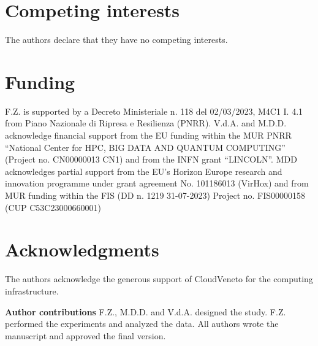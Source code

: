\documentclass[10pt, aps, rmp,  twocolumn, superscriptaddress, floatfix, showkeys]{revtex4-2}
\begin{document}
\section*{Competing interests}
The authors declare that they have no competing interests.

\section*{Funding}
F.Z. is supported by a Decreto Ministeriale n. 118 del 02/03/2023, M4C1 I. 4.1 from Piano Nazionale di Ripresa e Resilienza (PNRR). V.d.A. and M.D.D. acknowledge financial support from the EU funding within the MUR PNRR “National Center for HPC, BIG DATA AND QUANTUM COMPUTING” (Project no. CN00000013 CN1) and from the INFN grant “LINCOLN”. MDD acknowledges partial support from the EU’s Horizon Europe research and innovation programme under grant agreement No. 101186013 (VirHox) and from MUR funding within the FIS (DD n. 1219 31-07-2023) Project no. FIS00000158 (CUP C53C23000660001)

\section*{Acknowledgments}
The authors acknowledge the generous support of CloudVeneto for the computing infrastructure.

\vspace{0.2 cm}
\vspace{0.2 cm}


{\bf Author contributions} 
F.Z., M.D.D. and V.d.A. designed the study. F.Z. performed the experiments and analyzed the data. All authors wrote the manuscript and approved the final version.

\vspace{0.2 cm}



\renewcommand{\bibsection}{\section{References}}


\end{document}
